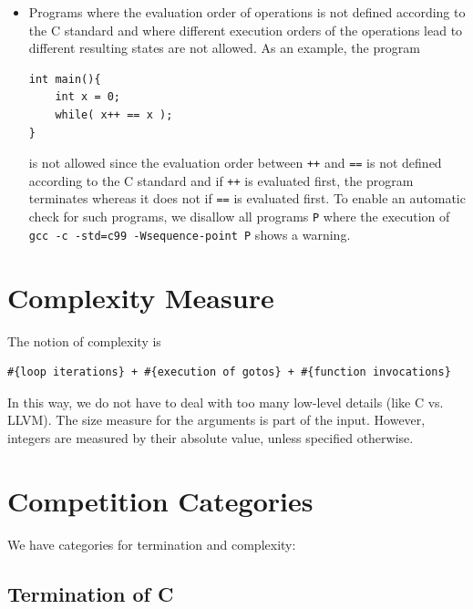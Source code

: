 \begin{itemize}
\begin{itemize}
  \item \texttt{short}: 16 bit
  \item \texttt{int}: 32 bit
  \item \texttt{long}: 64 bit
  \item \texttt{float}: 32 bit
  \item \texttt{double}: 64 bit
  \item pointer: 64 bit
  \end{itemize}
%
\item Programs where the evaluation order of operations is not defined according to the C standard and where different execution orders of the operations lead to different resulting states are not allowed.
  As an example, the program
\begin{verbatim}
int main(){
    int x = 0;
    while( x++ == x );
}
\end{verbatim}
  is not allowed since the evaluation order between \texttt{++} and \texttt{==} is not defined according to the C standard and if \texttt{++} is evaluated first, the program terminates whereas it does not if \texttt{==} is evaluated first.
  To enable an automatic check for such programs, we disallow all programs \texttt{P} where the execution of \texttt{gcc -c -std=c99 -Wsequence-point P} shows a warning.
\end{itemize}

\section{Complexity Measure}

The notion of complexity is
%
\begin{verbatim}
#{loop iterations} + #{execution of gotos} + #{function invocations}
\end{verbatim}
%
In this way, we do not have to deal with too many low-level details (like C vs. LLVM).
%
The size measure for the arguments is part of the input.
%
However, integers are measured by their absolute value, unless specified otherwise.

\section{Competition Categories}

We have categories for termination and complexity:

\subsection{Termination of C}

